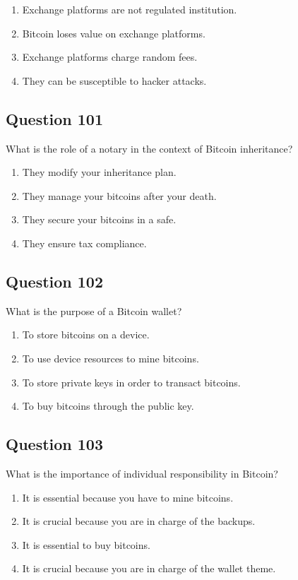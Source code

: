 \documentclass[12pt,a4paper]{article}
\begin{document}
\begin{enumerate}[label=\Alph*., leftmargin=*]
\item Exchange platforms are not regulated institution.
\item Bitcoin loses value on exchange platforms.
\item Exchange platforms charge random fees.
\item They can be susceptible to hacker attacks.
\end{enumerate}

\bigskip


\subsection*{Question 101}
What is the role of a notary in the context of Bitcoin inheritance?

\begin{enumerate}[label=\Alph*., leftmargin=*]
\item They modify your inheritance plan.
\item They manage your bitcoins after your death.
\item They secure your bitcoins in a safe.
\item They ensure tax compliance.
\end{enumerate}

\bigskip


\subsection*{Question 102}
What is the purpose of a Bitcoin wallet?

\begin{enumerate}[label=\Alph*., leftmargin=*]
\item To store bitcoins on a device.
\item To use device resources to mine bitcoins.
\item To store private keys in order to transact bitcoins.
\item To buy bitcoins through the public key.
\end{enumerate}

\bigskip


\subsection*{Question 103}
What is the importance of individual responsibility in Bitcoin?

\begin{enumerate}[label=\Alph*., leftmargin=*]
\item It is essential because you have to mine bitcoins.
\item It is crucial because you are in charge of the backups.
\item It is essential to buy bitcoins.
\item It is crucial because you are in charge of the wallet theme.
\end{enumerate}
\end{document}
